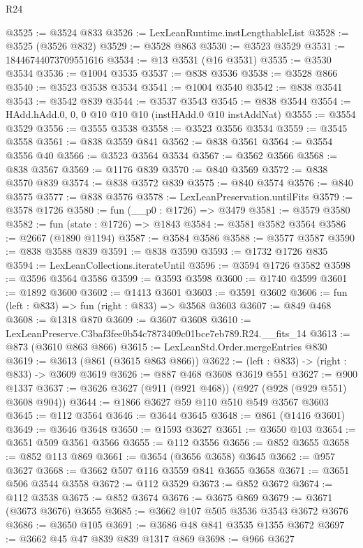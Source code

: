 \begin{lexlean}{R24}
\begin{coremodule}
@3525 := @3524 @833
@3526 := LexLeanRuntime.instLengthableList
@3528 := @3525 (@3526 @832)
@3529 := @3528 @863
@3530 := @3523 @3529
@3531 := 18446744073709551616
@3534 := @13 @3531 (@16 @3531)
@3535 := @3530 @3534
@3536 := @1004 @3535
@3537 := @838 @3536
@3538 := @3528 @866
@3540 := @3523 @3538 @3534
@3541 := @1004 @3540
@3542 := @838 @3541
@3543 := @3542 @839
@3544 := @3537 @3543
@3545 := @838 @3544
@3554 := HAdd.hAdd.{0, 0, 0} @10 @10 @10 (instHAdd.{0} @10 instAddNat)
@3555 := @3554 @3529
@3556 := @3555 @3538
@3558 := @3523 @3556 @3534
@3559 := @3545 @3558
@3561 := @838 @3559 @841
@3562 := @838 @3561
@3564 := @3554 @3556 @40
@3566 := @3523 @3564 @3534
@3567 := @3562 @3566
@3568 := @838 @3567
@3569 := @1176 @839
@3570 := @840 @3569
@3572 := @838 @3570 @839
@3574 := @838 @3572 @839
@3575 := @840 @3574
@3576 := @840 @3575
@3577 := @838 @3576
@3578 := LexLeanPreservation.untilFits
@3579 := @3578 @1726
@3580 := fun (__p0 : @1726) => @3479
@3581 := @3579 @3580
@3582 := fun (state : @1726) => @1843
@3584 := @3581 @3582 @3564
@3586 := @2667 (@1890 @1194)
@3587 := @3584 @3586
@3588 := @3577 @3587
@3590 := @838 @3588 @839
@3591 := @838 @3590
@3593 := @1732 @1726 @835
@3594 := LexLeanCollections.iterateUntil
@3596 := @3594 @1726 @3582
@3598 := @3596 @3564 @3586
@3599 := @3593 @3598
@3600 := @1740 @3599
@3601 := @1892 @3600
@3602 := @1413 @3601
@3603 := @3591 @3602
@3606 := fun (left : @833) => fun (right : @833) => @3568 @3603
@3607 := @849 @468
@3608 := @1318 @870
@3609 := @3607 @3608
@3610 := LexLeanPreserve.C3baf3fee0b54c7873409c01bce7eb789.R24.__fits_14
@3613 := @873 (@3610 @863 @866)
@3615 := LexLeanStd.Order.mergeEntries @830
@3619 := @3613 (@861 (@3615 @863 @866))
@3622 := (left : @833) -> (right : @833) -> @3609 @3619
@3626 := @887 @468 @3608 @3619 @551
@3627 := @900 @1337
@3637 := @3626 @3627 (@911 (@921 @468)) (@927 (@928 (@929 @551) @3608 @904))
@3644 := @1866 @3627 @59 @110 @510 @549 @3567 @3603
@3645 := @112 @3564
@3646 := @3644 @3645
@3648 := @861 (@1416 @3601)
@3649 := @3646 @3648
@3650 := @1593 @3627
@3651 := @3650 @103
@3654 := @3651 @509 @3561 @3566
@3655 := @112 @3556
@3656 := @852 @3655
@3658 := @852 @113 @869
@3661 := @3654 (@3656 @3658) @3645
@3662 := @957 @3627
@3668 := @3662 @507 @116 @3559 @841 @3655 @3658
@3671 := @3651 @506 @3544 @3558
@3672 := @112 @3529
@3673 := @852 @3672
@3674 := @112 @3538
@3675 := @852 @3674
@3676 := @3675 @869
@3679 := @3671 (@3673 @3676) @3655
@3685 := @3662 @107 @505 @3536 @3543 @3672 @3676
@3686 := @3650 @105
@3691 := @3686 @48 @841 @3535 @1355 @3672
@3697 := @3662 @45 @47 @839 @839 @1317 @869
@3698 := @966 @3627

\end{coremodule}
\end{lexlean}

